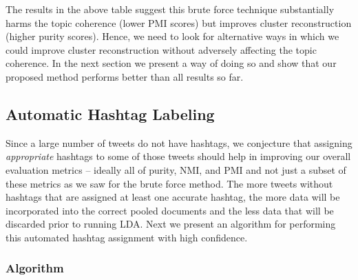 \documentclass{sig-alternate}
\begin{document}
The results in the above table suggest this brute force technique
substantially harms the topic coherence (lower PMI scores) but
improves cluster reconstruction (higher purity scores).  Hence, we
need to look for alternative ways in which we could improve cluster
reconstruction without adversely affecting the topic coherence. In the
next section we present a way of doing so and show that our proposed
method performs better than all results so far.

\subsection*{Automatic Hashtag Labeling}

\label{subsec:assign_hashtags}

Since a large number of tweets do not have hashtags, we conjecture
that assigning \emph{appropriate} hashtags to some of those tweets
should help in improving our overall evaluation metrics -- ideally all
of purity, NMI, and PMI and not just a subset of these metrics as we
saw for the brute force method.  The more tweets without hashtags that
are assigned at least one accurate hashtag, the more data will be
incorporated into the correct pooled documents and the less data that
will be discarded prior to running LDA.  Next we present an algorithm
for performing this automated hashtag assignment with high confidence.

\subsubsection*{Algorithm}
\end{document}
